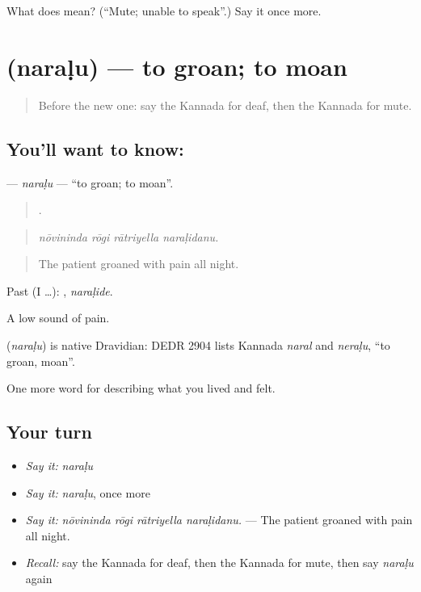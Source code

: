 \begin{tcolorbox}[breakable,colback=teal!4,colframe=teal!35!black,title={Before you move on}]
What does  mean? (\textquotedblleft{}Mute; unable to speak\textquotedblright{}.) Say it once more.
\end{tcolorbox}
\section[\texorpdfstring{\kn{ನರಳು} (naraḷu)}{ನರಳು (naraḷu)}]{ (naraḷu) — to groan; to moan}

\label{lesson:KA-C515-naralu}



\begin{quote}
Before the new one: say the Kannada for deaf, then the Kannada for mute.
\end{quote}

\subsection*{You'll want to know: }
\textbf{} — \emph{naraḷu} — \textquotedblleft{}to groan; to moan\textquotedblright{}.

\begin{quote}
   .
\end{quote}

\begin{quote}
\emph{nōvininda rōgi rātriyella naraḷidanu.}
\end{quote}

\begin{quote}
The patient groaned with pain all night.
\end{quote}

Past (I …): , \emph{naraḷide}.

A low sound of pain.

\begin{cousinweb}
\textbf{} (\emph{naraḷu}) is native Dravidian: DEDR 2904 lists Kannada \emph{naral} and \emph{neraḷu}, \textquotedblleft{}to groan, moan\textquotedblright{}.
\end{cousinweb}

\begin{grammarlens}[title={What you've built}]
One more word for describing what you lived and felt.
\end{grammarlens}

\subsection*{Your turn}
\begin{itemize}
\raggedright
  \item \emph{Say it:} \emph{naraḷu}
  \item \emph{Say it:} \emph{naraḷu}, once more
  \item \emph{Say it:} \emph{nōvininda rōgi rātriyella naraḷidanu.} — The patient groaned with pain all night.
  \item \emph{Recall:} say the Kannada for deaf, then the Kannada for mute, then say \emph{naraḷu} again
\end{itemize}

